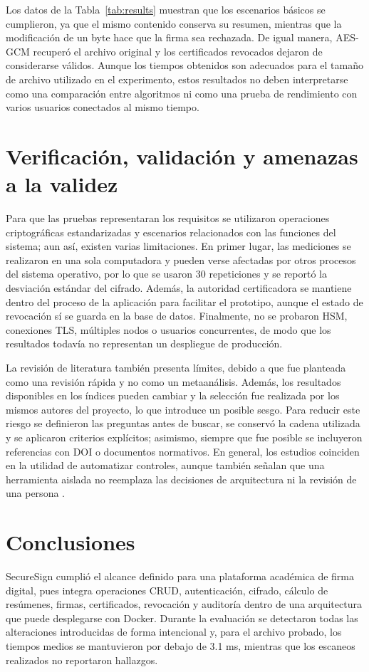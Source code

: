\documentclass[conference]{IEEEtran}
\begin{document}
Los datos de la Tabla~\ref{tab:results} muestran que los escenarios básicos se cumplieron, ya que el mismo contenido conserva su resumen, mientras que la modificación de un byte hace que la firma sea rechazada. De igual manera, AES-GCM recuperó el archivo original y los certificados revocados dejaron de considerarse válidos. Aunque los tiempos obtenidos son adecuados para el tamaño de archivo utilizado en el experimento, estos resultados no deben interpretarse como una comparación entre algoritmos ni como una prueba de rendimiento con varios usuarios conectados al mismo tiempo.

\section{Verificación, validación y amenazas a la validez}
Para que las pruebas representaran los requisitos se utilizaron operaciones criptográficas estandarizadas y escenarios relacionados con las funciones del sistema; aun así, existen varias limitaciones. En primer lugar, las mediciones se realizaron en una sola computadora y pueden verse afectadas por otros procesos del sistema operativo, por lo que se usaron 30 repeticiones y se reportó la desviación estándar del cifrado. Además, la autoridad certificadora se mantiene dentro del proceso de la aplicación para facilitar el prototipo, aunque el estado de revocación sí se guarda en la base de datos. Finalmente, no se probaron HSM, conexiones TLS, múltiples nodos o usuarios concurrentes, de modo que los resultados todavía no representan un despliegue de producción.

La revisión de literatura también presenta límites, debido a que fue planteada como una revisión rápida y no como un metaanálisis. Además, los resultados disponibles en los índices pueden cambiar y la selección fue realizada por los mismos autores del proyecto, lo que introduce un posible sesgo. Para reducir este riesgo se definieron las preguntas antes de buscar, se conservó la cadena utilizada y se aplicaron criterios explícitos; asimismo, siempre que fue posible se incluyeron referencias con DOI o documentos normativos. En general, los estudios coinciden en la utilidad de automatizar controles, aunque también señalan que una herramienta aislada no reemplaza las decisiones de arquitectura ni la revisión de una persona \cite{rajapakse2022,akbar2024,lee2024}.

\section{Conclusiones}
SecureSign cumplió el alcance definido para una plataforma académica de firma digital, pues integra operaciones CRUD, autenticación, cifrado, cálculo de resúmenes, firmas, certificados, revocación y auditoría dentro de una arquitectura que puede desplegarse con Docker. Durante la evaluación se detectaron todas las alteraciones introducidas de forma intencional y, para el archivo probado, los tiempos medios se mantuvieron por debajo de 3.1 ms, mientras que los escaneos realizados no reportaron hallazgos.
\end{document}
